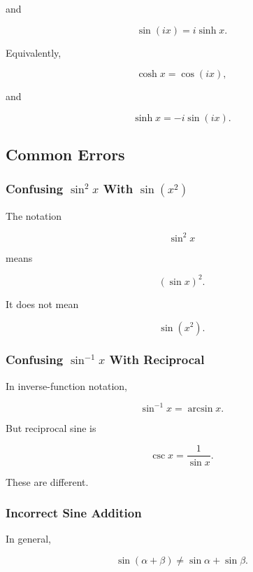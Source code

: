 and

\[
\boxed{
\sin(ix)
=
i\sinh x.
}
\]

Equivalently,

\[
\boxed{
\cosh x
=
\cos(ix),
}
\]

and

\[
\boxed{
\sinh x
=
-i\sin(ix).
}
\]

\subsection{Common Errors}
\label{subsec:trigonometric-identities-common-errors}

\subsubsection{Confusing \(\sin^2x\) With \(\sin(x^2)\)}

The notation

\[
\boxed{
\sin^2x
}
\]

means

\[
\boxed{
(\sin x)^2.
}
\]

It does not mean

\[
\sin(x^2).
\]

\subsubsection{Confusing \(\sin^{-1}x\) With Reciprocal}

In inverse-function notation,

\[
\boxed{
\sin^{-1}x
=
\arcsin x.
}
\]

But reciprocal sine is

\[
\boxed{
\csc x
=
\frac1{\sin x}.
}
\]

These are different.

\subsubsection{Incorrect Sine Addition}
\label{subsec:false-sine-addition}

In general,

\[
\boxed{
\sin(\alpha+\beta)
\neq
\sin\alpha+\sin\beta.
}
\]

